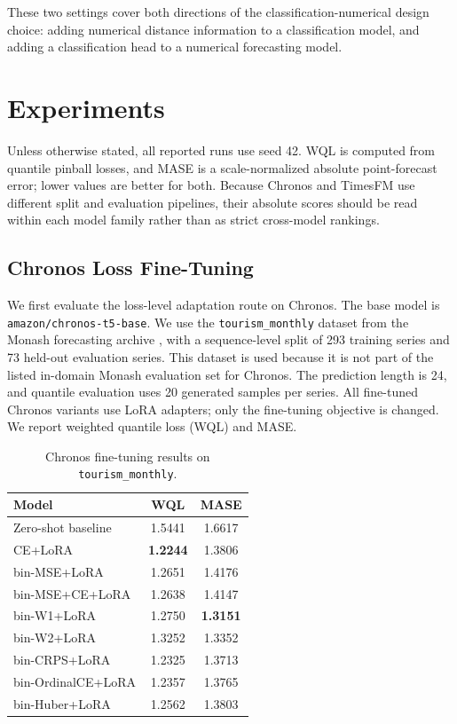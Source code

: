 \documentclass{article}
\begin{document}
These two settings cover both directions of the classification-numerical design
choice: adding numerical distance information to a classification model, and
adding a classification head to a numerical forecasting model.

\section{Experiments}

Unless otherwise stated, all reported runs use seed 42.  WQL is computed from
quantile pinball losses, and MASE is a scale-normalized absolute point-forecast
error; lower values are better for both.  Because Chronos and TimesFM use
different split and evaluation pipelines, their absolute scores should be read
within each model family rather than as strict cross-model rankings.

\subsection{Chronos Loss Fine-Tuning}

We first evaluate the loss-level adaptation route on Chronos.  The base model is
\texttt{amazon/chronos-t5-base}.  We use the \texttt{tourism\_monthly} dataset
from the Monash forecasting archive \citep{godahewa2021monash}, with a
sequence-level split of 293 training series and 73 held-out evaluation series.
This dataset is used because it is not part of the listed in-domain Monash
evaluation set for Chronos.  The prediction length is 24, and quantile
evaluation uses 20 generated samples per series.  All fine-tuned Chronos
variants use LoRA adapters; only the fine-tuning objective is changed.  We
report weighted quantile loss (WQL) and MASE.

\begin{table}[H]
    \centering
    \caption{Chronos fine-tuning results on \texttt{tourism\_monthly}.}
    \label{tab:chronos-results}
    \begin{tabular}{lcc}
        \toprule
        Model & WQL & MASE \\
        \midrule
        Zero-shot baseline & 1.5441 & 1.6617 \\
        \midrule
        CE+LoRA & \textbf{1.2244} & 1.3806 \\
        bin-MSE+LoRA & 1.2651 & 1.4176 \\
        bin-MSE+CE+LoRA & 1.2638 & 1.4147 \\
        bin-W1+LoRA & 1.2750 & \textbf{1.3151} \\
        bin-W2+LoRA & 1.3252 & 1.3352 \\
        bin-CRPS+LoRA & 1.2325 & 1.3713 \\
        bin-OrdinalCE+LoRA & 1.2357 & 1.3765 \\
        bin-Huber+LoRA & 1.2562 & 1.3803 \\
        \bottomrule
    \end{tabular}
\end{table}
\end{document}
